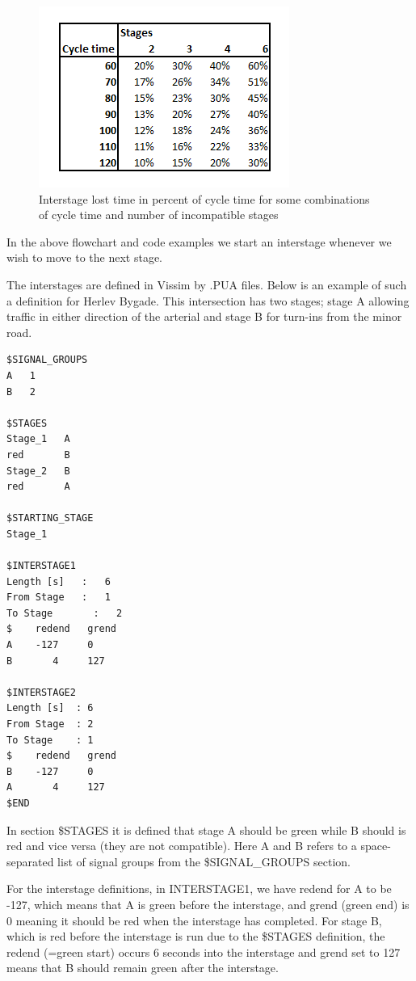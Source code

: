 \begin{figure}[!ht]
\begin{center}
\includegraphics[scale=0.6]{interstage_lost_time.png} 
\end{center}
\caption{Interstage lost time in percent of cycle time for some combinations of cycle time and number of incompatible stages}
\label{fig:lost_time_example}
\end{figure}

In the above flowchart and code examples we start an interstage whenever we wish to move to the next stage.

The interstages are defined in Vissim by .PUA files. Below is an example of such a definition for Herlev Bygade. This intersection has two stages; stage A allowing traffic in either direction of the arterial and stage B for turn-ins from the minor road. 

\begin{verbatim}
$SIGNAL_GROUPS
A   1
B   2

$STAGES
Stage_1   A
red       B
Stage_2   B
red       A

$STARTING_STAGE
Stage_1

$INTERSTAGE1
Length [s]	 :   6
From Stage	 :   1
To Stage	   :   2
$    redend   grend
A    -127     0
B       4     127

$INTERSTAGE2
Length [s]	: 6
From Stage	: 2
To Stage	: 1
$    redend   grend
B    -127     0
A       4     127
$END
\end{verbatim}

In section \$STAGES it is defined that stage A should be green while B should is red and vice versa (they are not compatible). Here A and B refers to a space-separated list of signal groups from the \$SIGNAL\_GROUPS section.

For the interstage definitions, in INTERSTAGE1, we have redend for A to be -127, which means that A is green before the interstage, and grend (green end) is 0 meaning it should be red when the interstage has completed. For stage B, which is red before the interstage is run due to the \$STAGES definition, the redend (=green start) occurs 6 seconds into the interstage and grend set to 127 means that B should remain green after the interstage.

